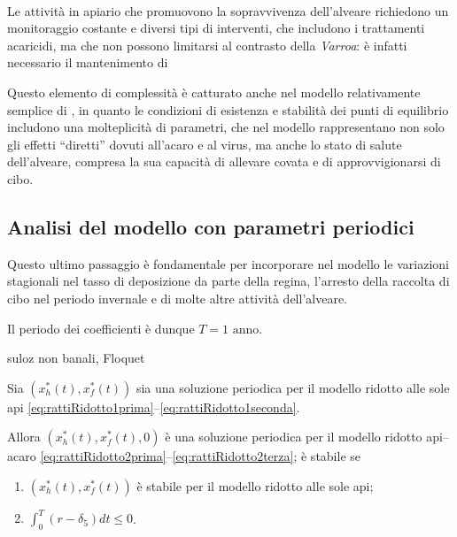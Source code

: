 \paragraph{}
Le attività in apiario che promuovono la sopravvivenza dell'alveare richiedono un monitoraggio costante e diversi tipi di interventi, che includono i trattamenti acaricidi, ma che non possono limitarsi al contrasto della \emph{Varroa}: è infatti necessario il mantenimento di 

Questo elemento di complessità è catturato anche nel modello relativamente semplice di \cite{ratti2017}, in quanto le condizioni di esistenza e stabilità dei punti di equilibrio includono una molteplicità di parametri, che nel modello rappresentano non solo gli effetti ``diretti'' dovuti all'acaro e al virus, ma anche lo stato di salute dell'alveare, compresa la sua capacità di allevare covata e di approvvigionarsi di cibo.


\subsection{Analisi del modello con parametri periodici}
\label{sez:paramPeriodici}
Questo ultimo passaggio è fondamentale per incorporare nel modello le variazioni stagionali nel tasso di deposizione da parte della regina, l'arresto della raccolta di cibo nel periodo invernale e di molte altre attività dell'alveare.

Il periodo dei coefficienti è dunque $T= 1 \text{ anno}$.

suloz non banali, Floquet

\begin{proposizione}
    Sia $\left( x_h^*(t), x_f^*(t) \right)$ sia una soluzione periodica per il modello ridotto alle sole api \eqref{eq:rattiRidotto1prima}--\eqref{eq:rattiRidotto1seconda}.

    Allora $\left( x_h^*(t), x_f^*(t), 0 \right)$ è una soluzione periodica per il modello ridotto api--acaro \eqref{eq:rattiRidotto2prima}--\eqref{eq:rattiRidotto2terza}; è stabile se
    \begin{enumerate}
        \item $\left( x_h^*(t), x_f^*(t) \right)$ è stabile per il modello ridotto alle sole api;
        \item $\int_0^T (r - \delta_5) dt \leq 0$.
    \end{enumerate}
\end{proposizione}


